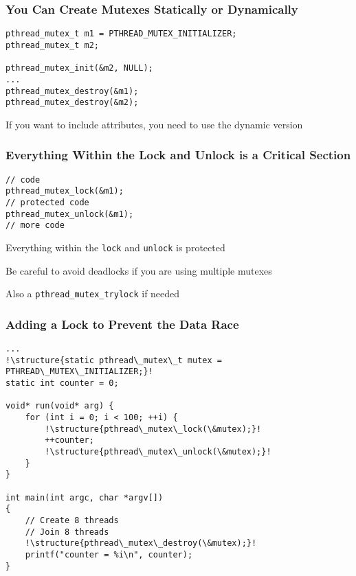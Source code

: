   \begin{frame}[fragile]
    \frametitle{You Can Create Mutexes Statically or Dynamically}

    \begin{lstlisting}
pthread_mutex_t m1 = PTHREAD_MUTEX_INITIALIZER;
pthread_mutex_t m2;

pthread_mutex_init(&m2, NULL);
...
pthread_mutex_destroy(&m1);
pthread_mutex_destroy(&m2);
    \end{lstlisting}

    \vspace{2em}

    If you want to include attributes, you need to use the dynamic version
  \end{frame}

  \begin{frame}[fragile]
    \frametitle{Everything Within the Lock and Unlock is a Critical Section}

    \begin{lstlisting}
// code
pthread_mutex_lock(&m1);
// protected code
pthread_mutex_unlock(&m1);
// more code
    \end{lstlisting}

    \vspace{2em}

    Everything within the {\tt lock} and {\tt unlock} is protected

    \vspace{2em}

    Be careful to avoid deadlocks if you are using multiple mutexes

    \vspace{2em}

    Also a {\tt pthread\_mutex\_trylock} if needed
  \end{frame}

  \begin{frame}[fragile]
    \frametitle{Adding a Lock to Prevent the Data Race}
    \begin{lstlisting}[escapechar=!]
...
!\structure{static pthread\_mutex\_t mutex = PTHREAD\_MUTEX\_INITIALIZER;}!
static int counter = 0;

void* run(void* arg) {
    for (int i = 0; i < 100; ++i) {
        !\structure{pthread\_mutex\_lock(\&mutex);}!
        ++counter;
        !\structure{pthread\_mutex\_unlock(\&mutex);}!
    }
}

int main(int argc, char *argv[])
{
    // Create 8 threads
    // Join 8 threads
    !\structure{pthread\_mutex\_destroy(\&mutex);}!
    printf("counter = %i\n", counter);
}
    \end{lstlisting}
  \end{frame}

